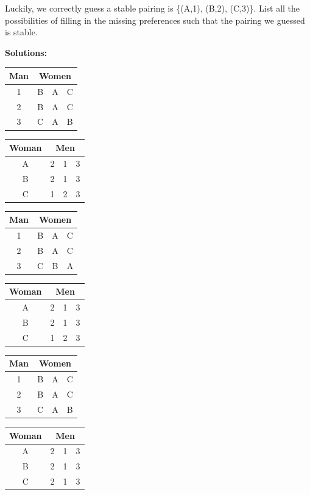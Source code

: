 \documentclass[11pt]{article}
\newif\ifsolutions
\begin{document}
\begin{qunlist}
\begin{itemize}
Luckily, we correctly guess a stable pairing is \{(A,1), (B,2), (C,3)\}. 
List all the possibilities of filling in the missing preferences such that the pairing we guessed is stable.

\ifsolutions
\textbf{Solutions:}

\begin{center}
\begin{tabular}{|c|ccc|}\hline 
Man&\multicolumn{3}{|c|}{Women}\\\hline 
1&B&A&C\\\hline 
2&B&A&C\\\hline 
3&C&A&B\\\hline
\end{tabular} 
\hspace{2cm}
\begin{tabular}{|c|ccc|}\hline 
Woman&\multicolumn{3}{|c|}{Men}\\\hline 
A&2&1&3\\\hline 
B&2&1&3\\\hline 
C&1&2&3\\\hline
\end{tabular}
\end{center}

\begin{center}
\begin{tabular}{|c|ccc|}\hline 
Man&\multicolumn{3}{|c|}{Women}\\\hline 
1&B&A&C\\\hline 
2&B&A&C\\\hline 
3&C&B&A\\\hline
\end{tabular} 
\hspace{2cm}
\begin{tabular}{|c|ccc|}\hline 
Woman&\multicolumn{3}{|c|}{Men}\\\hline 
A&2&1&3\\\hline 
B&2&1&3\\\hline 
C&1&2&3\\\hline
\end{tabular}
\end{center}

\begin{center}
\begin{tabular}{|c|ccc|}\hline 
Man&\multicolumn{3}{|c|}{Women}\\\hline 
1&B&A&C\\\hline 
2&B&A&C\\\hline 
3&C&A&B\\\hline
\end{tabular} 
\hspace{2cm}
\begin{tabular}{|c|ccc|}\hline 
Woman&\multicolumn{3}{|c|}{Men}\\\hline 
A&2&1&3\\\hline 
B&2&1&3\\\hline 
C&2&1&3\\\hline
\end{tabular}
\end{center}


\end{itemize}
\end{qunlist}
\end{document}
